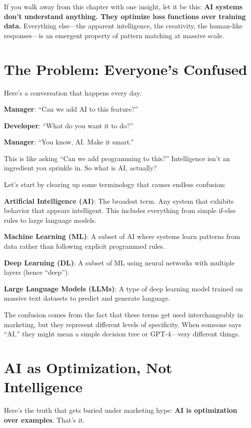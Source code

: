 \documentclass[11pt,oneside]{book}
\begin{document}
If you walk away from this chapter with one insight, let it be this: \textbf{AI systems don't understand anything. They optimize loss functions over training data.} Everything else---the apparent intelligence, the creativity, the human-like responses---is an emergent property of pattern matching at massive scale.

\section{The Problem: Everyone's Confused}

Here's a conversation that happens every day:

\textbf{Manager}: ``Can we add AI to this feature?''

\textbf{Developer}: ``What do you want it to do?''

\textbf{Manager}: ``You know, AI. Make it smart.''

This is like asking ``Can we add programming to this?'' Intelligence isn't an ingredient you sprinkle in. So what is AI, actually?

Let's start by clearing up some terminology that causes endless confusion:

\textbf{Artificial Intelligence (AI)}: The broadest term. Any system that exhibits behavior that appears intelligent. This includes everything from simple if-else rules to large language models.

\textbf{Machine Learning (ML)}: A subset of AI where systems learn patterns from data rather than following explicit programmed rules.

\textbf{Deep Learning (DL)}: A subset of ML using neural networks with multiple layers (hence ``deep'').

\textbf{Large Language Models (LLMs)}: A type of deep learning model trained on massive text datasets to predict and generate language.

The confusion comes from the fact that these terms get used interchangeably in marketing, but they represent different levels of specificity. When someone says ``AI,'' they might mean a simple decision tree or GPT-4---very different things.

\section{AI as Optimization, Not Intelligence}

Here's the truth that gets buried under marketing hype: \textbf{AI is optimization over examples}. That's it.
\end{document}
